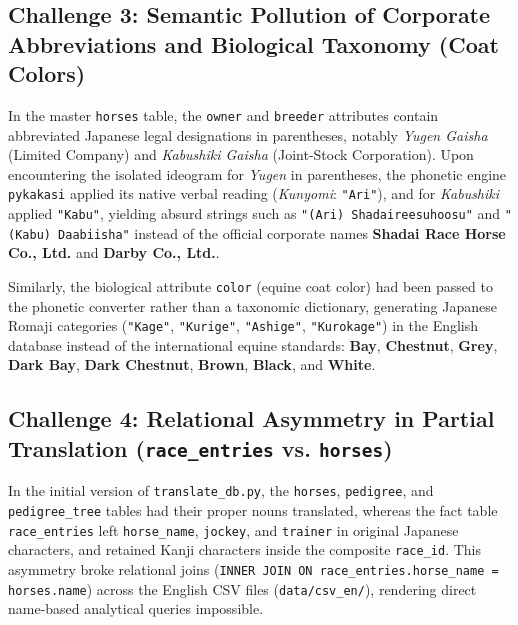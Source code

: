 \documentclass[12pt,a4paper]{article}
\begin{document}
\subsection{Challenge 3: Semantic Pollution of Corporate Abbreviations and Biological Taxonomy (Coat Colors)}
In the master \texttt{horses} table, the \texttt{owner} and \texttt{breeder} attributes contain abbreviated Japanese legal designations in parentheses, notably \textit{Yugen Gaisha} (Limited Company) and \textit{Kabushiki Gaisha} (Joint-Stock Corporation).
Upon encountering the isolated ideogram for \textit{Yugen} in parentheses, the phonetic engine \texttt{pykakasi} applied its native verbal reading (\textit{Kunyomi}: \texttt{"Ari"}), and for \textit{Kabushiki} applied \texttt{"Kabu"}, yielding absurd strings such as \texttt{"(Ari) Shadaireesuhoosu"} and \texttt{"(Kabu) Daabiisha"} instead of the official corporate names \textbf{Shadai Race Horse Co., Ltd.} and \textbf{Darby Co., Ltd.}.

Similarly, the biological attribute \texttt{color} (equine coat color) had been passed to the phonetic converter rather than a taxonomic dictionary, generating Japanese Romaji categories (\texttt{"Kage"}, \texttt{"Kurige"}, \texttt{"Ashige"}, \texttt{"Kurokage"}) in the English database instead of the international equine standards: \textbf{Bay}, \textbf{Chestnut}, \textbf{Grey}, \textbf{Dark Bay}, \textbf{Dark Chestnut}, \textbf{Brown}, \textbf{Black}, and \textbf{White}.

\subsection{Challenge 4: Relational Asymmetry in Partial Translation (\texttt{race\_entries} vs. \texttt{horses})}
In the initial version of \texttt{translate\_db.py}, the \texttt{horses}, \texttt{pedigree}, and \texttt{pedigree\_tree} tables had their proper nouns translated, whereas the fact table \texttt{race\_entries} left \texttt{horse\_name}, \texttt{jockey}, and \texttt{trainer} in original Japanese characters, and retained Kanji characters inside the composite \texttt{race\_id}.
This asymmetry broke relational joins (\texttt{INNER JOIN ON race\_entries.horse\_name = horses.name}) across the English CSV files (\texttt{data/csv\_en/}), rendering direct name-based analytical queries impossible.
\end{document}

